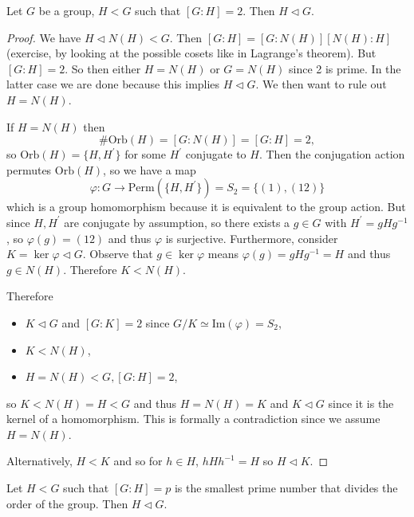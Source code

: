\begin{prop}
Let $G$ be a group, $H < G$ such that $[G : H] = 2$.
Then $H \triangleleft G$.
\end{prop}
\begin{proof}
We have $H \triangleleft N(H) < G$. Then
$[G : H] = [G : N(H)][N(H) : H]$ (exercise, by looking at the possible
cosets like in Lagrange's theorem).
But $[G : H] = 2$. So then either $H = N(H)$ or $G = N(H)$ since 2 is
prime. In the latter case we are done because this implies
$H \triangleleft G$. We then want to rule out $H = N(H)$.

If $H = N(H)$ then
$$
\# \mathrm{Orb}(H) = [G : N(H)] = [G : H] = 2,
$$
so $\mathrm{Orb}(H) = \{H, H^\prime \}$ for some $H^\prime$ conjugate
to $H$. Then the conjugation action permutes $\mathrm{Orb}(H)$, so
we have a map
$$
\varphi : G \to \mathrm{Perm}(\{H, H^\prime\}) = S_2 = \{(1), (1 2)\}
$$
which is a group homomorphism because it is equivalent to the group
action. But since $H, H^\prime$ are conjugate by assumption, so there
exists a $g \in G$ with $H^\prime = g H g^{-1}$, so $\varphi(g) = (1 2)$
and thus $\varphi$ is surjective. Furthermore, consider
$K = \ker \varphi \triangleleft G$. Observe that $g \in \ker \varphi$
means $\varphi(g) = g H g^{-1} = H$ and thus $g \in N(H)$. Therefore
$K < N(H)$.

Therefore
\begin{itemize}
  \item{$K \triangleleft G$ and $[G : K] = 2$ since
        $G/K \simeq \mathrm{Im}(\varphi) = S_2$,}
  \item{$K < N(H)$,}
  \item{$H = N(H) < G, [G : H] = 2$,}
\end{itemize}
so $K < N(H) = H < G$ and thus $H = N(H) = K$ and
$K \triangleleft G$ since it is the kernel of a homomorphism.
This is formally a contradiction since we assume $H = N(H)$.

Alternatively, $H < K$ and so for $h \in H$,
$h H h^{-1} = H$ so $H \triangleleft K$.
\end{proof}

\begin{exer}
Let $H < G$ such that $[G : H] = p$ is the smallest prime number that
divides the order of the group. Then $H \triangleleft G$.
\end{exer}